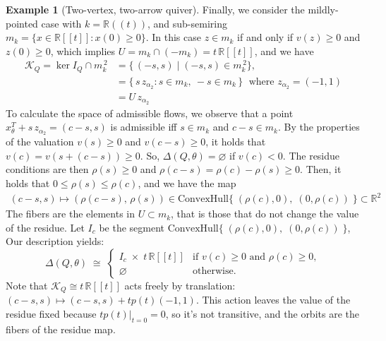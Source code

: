 \documentclass[12pt]{amsart}
\theoremstyle{plain}
\theoremstyle{definition}
\newtheorem{example}[theorem]{Example}
\begin{document}
\begin{example}[Two-vertex, two-arrow quiver]
Finally, we consider the mildly-pointed case with  $k = \mathbb{R}((t))$, and sub-semiring
$m_k = \{x \in \mathbb{R}[[t]] : x(0) \geq 0\}$. In this case $z \in m_k$ if and only if $v(z) \geq 0$ and
$z(0) \geq 0$, which implies
$U = m_k \cap (-m_k) = t\,\mathbb{R}[[t]]$, and we have
\begin{align*}
\mathcal{K}_Q = \ker I_Q \cap m_k^{\,2}
&=
\{\, (-s, s)\; |\; (-s, s) \in m_k^{\, 2} \},
\\
&=\{\, s\,z_{\alpha_2} : s \in m_k,\ -s \in m_k \,\}\; \text{ where $z_{\alpha_2} = (-1,1)$}
\\
&= U\, z_{\alpha_2}
\end{align*}
To calculate the space of admissible flows, we 
observe that a point $x^T_\theta + s\,z_{\alpha_2} = (c-s, s)$ is admissible iff $s \in m_k$ and $c - s \in m_k$.
By the properties of the valuation
$v(s) \geq 0$ and $v(c - s) \geq 0$, it holds that
$v(c) = v(s + (c-s)) \geq 0$. So, 
$\Delta(Q,\theta) = \varnothing$ if $v(c) < 0$.
The residue conditions are then
$\rho(s) \geq 0$ and $\rho(c - s) = \rho(c) - \rho(s) \geq 0$. Then, it holds that 
$0 \leq \rho(s) \leq \rho(c)$, and we have the map
\begin{align*}
(c-s,s) \mapsto 
( \rho(c-s), \, \rho(s) ) 
\in 
\text{ConvexHull} \{ \; (\rho(c),0), \; (0, \rho(c)) \;\}
\subset
\mathbb{R}^2
\end{align*}
The fibers are the elements in $U \subset m_k$, that is those that do not change the value of the residue. 
Let $I_{c}$ be the segment $\text{ConvexHull} \{ \; (\rho(c),0), \; (0, \rho(c)) \;\}$, 
Our description yields:
\[
  \Delta(Q,\theta) \;\cong\;
  \begin{cases}
    I_c \;\times\; t\,\mathbb{R}[[t]]
       & \text{if } v(c) \geq 0 \text{ and } \rho(c) \geq 0,\\[2pt]
    \varnothing & \text{otherwise.}
  \end{cases}
\]
Note that $\mathcal{K}_Q \cong t\,\mathbb{R}[[t]]$ acts freely by translation:
$(c-s, s) \mapsto (c-s, s) + tp(t)(-1, 1)$. This action leaves the value of the residue fixed because $tp(t)|_{t=0} =0$, so it's not transitive, and the orbits are the fibers of the residue map. 
\end{example}
\end{document}
